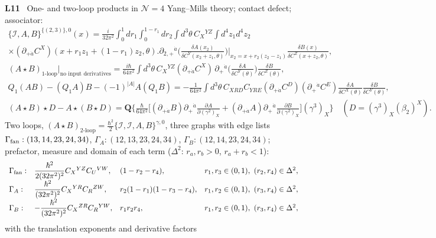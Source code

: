 \documentclass[10pt,a4paper]{article}
\numberwithin{equation}{section}
\newcommand{\cI}{\mathcal I}
\newcommand{\rid}[1]{\par\medskip\noindent\textbf{#1}\ }
\begin{document}
\rid{L11} One- and two-loop products in $\mathcal N=4$ Yang--Mills theory; contact defect; associator:
\begin{gather*}
\{\cI,A,B\}^{\{(2,3)\},0}(x)=\frac i{32\pi^2}\int_0^1dr_1\int_0^{1-r_1}dr_2\int d^3\theta\,C_X{}^{YZ}\int d^4z_1d^4z_2\\
\times(\partial_{+\dot a}C^X)(x+r_1z_1+(1-r_1)z_2,\theta)\Big.\partial_{2,+}{}^{\dot a}\Big(\frac{\delta A(x_2)}{\delta C^Y(x_2+z_1,\theta)}\Big)\Big|_{x_2=x+r_2(z_2-z_1)}\frac{\delta B(x)}{\delta C^Z(x+z_2,\theta)},\\
(A\star B)_{\text{1-loop}}\big|_{\text{no input derivatives}}=\frac{i\hbar}{64\pi^2}\int d^3\theta\,C_X{}^{YZ}(\partial_{+\dot a}C^X)\,\partial_+{}^{\dot a}\Big(\frac{\delta A}{\delta C^Y(\theta)}\Big)\frac{\delta B}{\delta C^Z(\theta)},\\
Q_1(AB)-(Q_1A)B-(-1)^{|A|}A(Q_1B)=-\frac1{64\pi^2}\int d^3\theta\,C_{XRD}C_{YRE}(\partial_{+\dot a}C^D)(\partial_+{}^{\dot a}C^E)\frac{\delta A}{\delta C^X(\theta)}\frac{\delta B}{\delta C^Y(\theta)},\\
(A\star B)\star D-A\star(B\star D)=\mathbf Q\Big\{\frac\hbar{64\pi^2}\Big[(\partial_{+\dot a}B)\partial_+{}^{\dot a}\frac{\partial A}{\partial(\gamma^2)_X}+(\partial_{+\dot a}A)\partial_+{}^{\dot a}\frac{\partial B}{\partial(\gamma^2)_X}\Big](\gamma^3)_X\Big\}\quad(D=(\gamma^3)_X(\beta_2)^X).
\end{gather*}
Two loops, $(A\star B)_{\text{2-loop}}=\frac{\hbar^2}2\{\cI,\cI,A,B\}^{\gamma,0}$, three graphs with edge lists $\Gamma_{\rm fan}:(13,14,23,24,34)$, $\Gamma_A:(12,13,23,24,34)$, $\Gamma_B:(12,14,23,24,34)$; prefactor, measure and domain of each term ($\Delta^2$: $r_a,r_b>0$, $r_a+r_b<1$):
\begin{equation*}
\begin{array}{llll}
\Gamma_{\rm fan}:&\dfrac{\hbar^2}{2(32\pi^2)^2}C_X{}^{YZ}C_U{}^{VW},&(1-r_2-r_4),&r_1,r_3\in(0,1),\ (r_2,r_4)\in\Delta^2,\\[4pt]
\Gamma_A:&\dfrac{\hbar^2}{(32\pi^2)^2}C_X{}^{YR}C_R{}^{ZW},&r_2(1-r_1)(1-r_3-r_4),&r_1,r_2\in(0,1),\ (r_3,r_4)\in\Delta^2,\\[4pt]
\Gamma_B:&-\dfrac{\hbar^2}{(32\pi^2)^2}C_X{}^{ZR}C_R{}^{YW},&r_1r_2r_4,&r_1,r_2\in(0,1),\ (r_3,r_4)\in\Delta^2,
\end{array}
\end{equation*}
with the translation exponents and derivative factors
\end{document}
